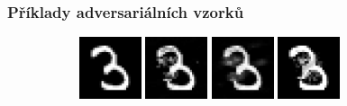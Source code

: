 \documentclass[czech]{beamer}
\begin{document}
\begin{frame}
    \frametitle{Příklady adversariálních vzorků}
    \begin{figure}
        \centering
        \begin{subfigure}[b]{\textwidth}
            \centering
            \includegraphics[width=0.2\textwidth]{Images/benign_4.png}
            \includegraphics[width=0.2\textwidth]{Images/l1_10.png}
            \includegraphics[width=0.2\textwidth]{Images/l2_10.png}
            \includegraphics[width=0.2\textwidth]{Images/w_0.1.png}
            

\end{subfigure}
\end{figure}
\end{frame}
\end{document}
